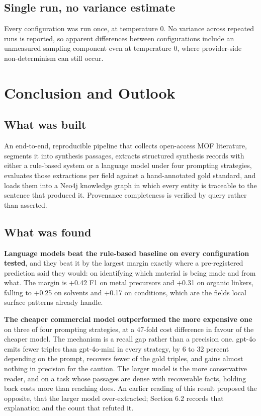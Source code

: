\documentclass[11pt,a4paper,oneside]{report}
\begin{document}
\section{Single run, no variance estimate}

Every configuration was run once, at temperature 0. No variance across repeated runs is reported, so apparent differences between configurations include an unmeasured sampling component even at temperature 0, where provider-side non-determinism can still occur.


\chapter{Conclusion and Outlook}


\section{What was built}

An end-to-end, reproducible pipeline that collects open-access MOF literature, segments it into synthesis passages, extracts structured synthesis records with either a rule-based system or a language model under four prompting strategies, evaluates those extractions per field against a hand-annotated gold standard, and loads them into a Neo4j knowledge graph in which every entity is traceable to the sentence that produced it. Provenance completeness is verified by query rather than asserted.

\section{What was found}

\textbf{Language models beat the rule-based baseline on every configuration tested}, and they beat it by the largest margin exactly where a pre-registered prediction said they would: on identifying which material is being made and from what. The margin is +0.42 F1 on metal precursors and +0.31 on organic linkers, falling to +0.25 on solvents and +0.17 on conditions, which are the fields local surface patterns already handle.

\textbf{The cheaper commercial model outperformed the more expensive one} on three of four prompting strategies, at a 47-fold cost difference in favour of the cheaper model. The mechanism is a recall gap rather than a precision one. gpt-4o emits fewer triples than gpt-4o-mini in every strategy, by 6 to 32 percent depending on the prompt, recovers fewer of the gold triples, and gains almost nothing in precision for the caution. The larger model is the more conservative reader, and on a task whose passages are dense with recoverable facts, holding back costs more than reaching does. An earlier reading of this result proposed the opposite, that the larger model over-extracted; Section 6.2 records that explanation and the count that refuted it.
\end{document}
